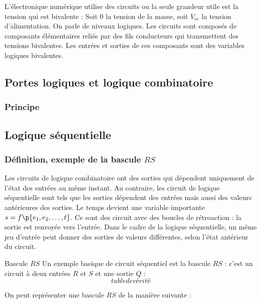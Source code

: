    L'électronique numérique utilise des circuits ou la seule grandeur utile est la tension qui est bivalente : Soit $0$ la tension de la masse, soit $V_\text{cc}$ la tension d'alimentation. On parle de niveaux logiques. Les circuits sont composés de composants élémentaires reliés par des fils conducteurs qui transmettent des tensions bivalentes. Les entrées et sorties de ces composants sont des variables logiques bivalentes.
    
    \subsection{Portes logiques et logique combinatoire}
    
    \subsubsection{Principe}
    
    \subsection{Logique séquentielle}
    
    \subsubsection{Définition, exemple de la bascule $RS$}
    
    Les circuits de logique combinatoire ont des sorties qui dépendent uniquement de l'état des entrées au même instant. Au contraire, les circuit de logique séquentielle sont tels que les sorties dépendent des entrées mais aussi des valeurs antérieures des sorties. Le temps devient une variable importante $s = f\p{e_1, e_2, \dots, t}$. Ce sont des circuit avec des boucles de rétroaction : la sortie est renvoyée vers l'entrée. Dans le cadre de la logique séquentielle, un même jeu d'entrée peut donner des sorties de valeurs différentes, selon l'état antérieur du circuit.
    
    \begin{definition}{Bascule $RS$}{}
        Un exemple basique de circuit séquentiel est la bascule $RS$ : c'est un circuit à deux entrées $R$ et $S$ et une sortie $Q$ :
        \[ table de vérité \]
    \end{definition}
    On peut représenter une bascule $RS$ de la manière suivante :
    \begin{center}
        \begin{tikzpicture}
            
        \end{tikzpicture}
    \end{center}
    
